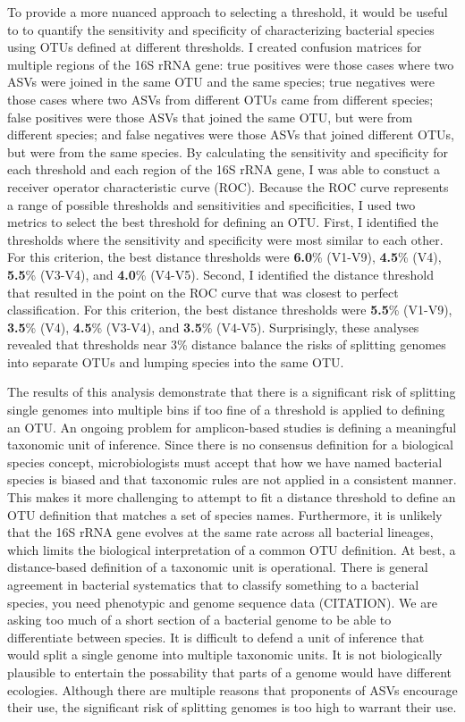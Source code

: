 \documentclass[
]{article}
\begin{document}
To provide a more nuanced approach to selecting a threshold, it would be
useful to to quantify the sensitivity and specificity of characterizing
bacterial species using OTUs defined at different thresholds. I created
confusion matrices for multiple regions of the 16S rRNA gene: true
positives were those cases where two ASVs were joined in the same OTU
and the same species; true negatives were those cases where two ASVs
from different OTUs came from different species; false positives were
those ASVs that joined the same OTU, but were from different species;
and false negatives were those ASVs that joined different OTUs, but were
from the same species. By calculating the sensitivity and specificity
for each threshold and each region of the 16S rRNA gene, I was able to
constuct a receiver operator characteristic curve (ROC). Because the ROC
curve represents a range of possible thresholds and sensitivities and
specificities, I used two metrics to select the best threshold for
defining an OTU. First, I identified the thresholds where the
sensitivity and specificity were most similar to each other. For this
criterion, the best distance thresholds were \textbf{6.0}\% (V1-V9),
\textbf{4.5}\% (V4), \textbf{5.5}\% (V3-V4), and \textbf{4.0}\% (V4-V5).
Second, I identified the distance threshold that resulted in the point
on the ROC curve that was closest to perfect classification. For this
criterion, the best distance thresholds were \textbf{5.5}\% (V1-V9),
\textbf{3.5}\% (V4), \textbf{4.5}\% (V3-V4), and \textbf{3.5}\% (V4-V5).
Surprisingly, these analyses revealed that thresholds near 3\% distance
balance the risks of splitting genomes into separate OTUs and lumping
species into the same OTU.

The results of this analysis demonstrate that there is a significant
risk of splitting single genomes into multiple bins if too fine of a
threshold is applied to defining an OTU. An ongoing problem for
amplicon-based studies is defining a meaningful taxonomic unit of
inference. Since there is no consensus definition for a biological
species concept, microbiologists must accept that how we have named
bacterial species is biased and that taxonomic rules are not applied in
a consistent manner. This makes it more challenging to attempt to fit a
distance threshold to define an OTU definition that matches a set of
species names. Furthermore, it is unlikely that the 16S rRNA gene
evolves at the same rate across all bacterial lineages, which limits the
biological interpretation of a common OTU definition. At best, a
distance-based definition of a taxonomic unit is operational. There is
general agreement in bacterial systematics that to classify something to
a bacterial species, you need phenotypic and genome sequence data
(CITATION). We are asking too much of a short section of a bacterial
genome to be able to differentiate between species. It is difficult to
defend a unit of inference that would split a single genome into
multiple taxonomic units. It is not biologically plausible to entertain
the possability that parts of a genome would have different ecologies.
Although there are multiple reasons that proponents of ASVs encourage
their use, the significant risk of splitting genomes is too high to
warrant their use.
\end{document}
